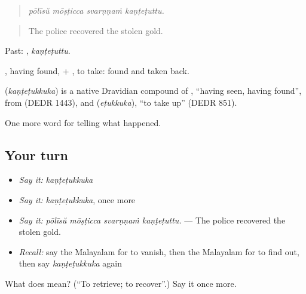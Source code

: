 \begin{quote}
\emph{pōlīsŭ mōṣṭicca svarṇṇaṁ kaṇṭeṭuttu.}
\end{quote}

\begin{quote}
The police recovered the stolen gold.
\end{quote}

Past: , \emph{kaṇṭeṭuttu}.

, having found, + , to take: found and taken back.

\begin{cousinweb}
\textbf{} (\emph{kaṇṭeṭukkuka}) is a native Dravidian compound of , \textquotedblleft{}having seen, having found\textquotedblright{}, from  (DEDR 1443), and  (\emph{eṭukkuka}), \textquotedblleft{}to take up\textquotedblright{} (DEDR 851).
\end{cousinweb}

\begin{grammarlens}[title={What you've built}]
One more word for telling what happened.
\end{grammarlens}

\subsection*{Your turn}
\begin{itemize}
\raggedright
  \item \emph{Say it:} \emph{kaṇṭeṭukkuka}
  \item \emph{Say it:} \emph{kaṇṭeṭukkuka}, once more
  \item \emph{Say it:} \emph{pōlīsŭ mōṣṭicca svarṇṇaṁ kaṇṭeṭuttu.} — The police recovered the stolen gold.
  \item \emph{Recall:} say the Malayalam for to vanish, then the Malayalam for to find out, then say \emph{kaṇṭeṭukkuka} again
\end{itemize}

\begin{tcolorbox}[breakable,colback=teal!4,colframe=teal!35!black,title={Before you move on}]
What does  mean? (\textquotedblleft{}To retrieve; to recover\textquotedblright{}.) Say it once more.
\end{tcolorbox}
